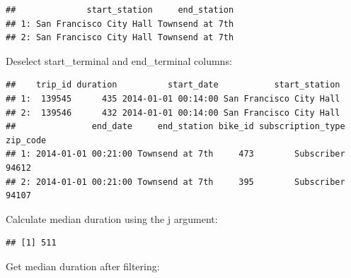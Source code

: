 \documentclass[]{book}
\newenvironment{Shaded}{\begin{snugshade}}{\end{snugshade}}
\newcommand{\DecValTok}[1]{\textcolor[rgb]{0.00,0.00,0.81}{#1}}
\newcommand{\KeywordTok}[1]{\textcolor[rgb]{0.13,0.29,0.53}{\textbf{#1}}}
\newcommand{\NormalTok}[1]{#1}
\newcommand{\OperatorTok}[1]{\textcolor[rgb]{0.81,0.36,0.00}{\textbf{#1}}}
\newcommand{\StringTok}[1]{\textcolor[rgb]{0.31,0.60,0.02}{#1}}
\begin{document}
\begin{verbatim}
##              start_station     end_station
## 1: San Francisco City Hall Townsend at 7th
## 2: San Francisco City Hall Townsend at 7th
\end{verbatim}

Deselect start\_terminal and end\_terminal columns:

\begin{Shaded}
\end{Shaded}

\begin{verbatim}
##    trip_id duration          start_date           start_station
## 1:  139545      435 2014-01-01 00:14:00 San Francisco City Hall
## 2:  139546      432 2014-01-01 00:14:00 San Francisco City Hall
##               end_date     end_station bike_id subscription_type zip_code
## 1: 2014-01-01 00:21:00 Townsend at 7th     473        Subscriber    94612
## 2: 2014-01-01 00:21:00 Townsend at 7th     395        Subscriber    94107
\end{verbatim}

Calculate median duration using the j argument:

\begin{Shaded}
\end{Shaded}

\begin{verbatim}
## [1] 511
\end{verbatim}

Get median duration after filtering:

\begin{Shaded}
\end{Shaded}
\end{document}
